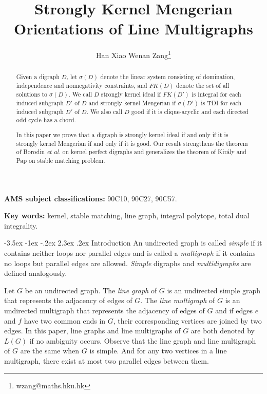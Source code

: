 \documentclass[11pt]{article}
\title{{\Large\bf  Strongly Kernel Mengerian Orientations of Line Multigraphs}}
\date{}
\author{Han Xiao \qquad Wenan Zang\footnote{wzang@maths.hku.hk}}
\affil{Department of Mathematics, 

The University of Hong Kong,

Hong Kong, China
}
\makeatletter
\numberwithin{theorem}{section}
\renewcommand\section{%
  \@startsection{section}{1}
                {\z@}%
                {-3.5ex \@plus -1ex \@minus -.2ex}%
                {2.3ex \@plus.2ex}%
                {\large\bfseries}%
}
\makeatother
\begin{document}

\maketitle

\jot

\begin{abstract}
Given a digraph $D$, let $\sigma(D)$ denote the linear system consisting of domination, independence and nonnegativity constraints, and $FK(D)$ denote the set of all solutions to $\sigma(D)$. We call $D$ strongly kernel ideal if $FK(D')$ is integral for each induced subgraph $D'$ of $D$ and strongly kernel Mengerian if $\sigma(D')$ is TDI for each induced subgraph $D'$ of $D$. We also call $D$ good if it is clique-acyclic and each directed odd cycle has a chord.

In this paper we prove that a digraph is strongly kernel ideal if and only if it is strongly kernel Mengerian if and only if it is good. Our result strengthens the theorem of Borodin \textit{et al.} \cite{BoroKost98} on kernel perfect digraphs and generalizes the theorem of Kir\'{a}ly and Pap \cite{KiraPap08} on stable matching problem.
\end{abstract}

\textbf{AMS subject classifications:} 90C10, 90C27, 90C57.

\textbf{Key words:} kernel, stable matching, line graph, integral polytope, total dual integrality.

\newpage
\section{Introduction}
\label{intro}
An undirected graph is called \textit{simple} if it contains neither loops nor parallel edges and is called a \textit{multigraph} if it contains no loops but parallel edges are allowed. 
\textit{Simple} digraphs and \textit{multidigraphs} are defined analogously. 

Let $G$ be an undirected graph.
The \textit{line graph} of $G$ is an undirected simple graph that represents the adjacency of edges of $G$. The \textit{line multigraph} of $G$ is an undirected multigraph that represents the adjacency of edges of $G$ and if edges $e$ and $f$ have two common ends in $G$, their corresponding vertices are joined by two edges. In this paper, line graphs and line multigraphs of $G$ are both denoted by $L(G)$ if no ambiguity occurs. Observe that the line graph and line multigraph of $G$ are the same when $G$ is simple. And for any two vertices in a line multigraph, there exist at most two parallel edges between them.
\end{document}
